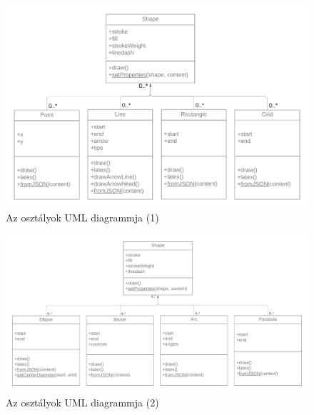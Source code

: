 







\begin{figure}[!h]
	\includegraphics[width=\textwidth]{images/uml1.png}
	\caption{Az osztályok UML diagrammja (1)}
	\label{fig:uml1}
\end{figure}

\begin{figure}[!h]
	\includegraphics[width=\textwidth]{images/uml2.png}
	\caption{Az osztályok UML diagrammja (2)}
	\label{fig:uml2}
\end{figure}

